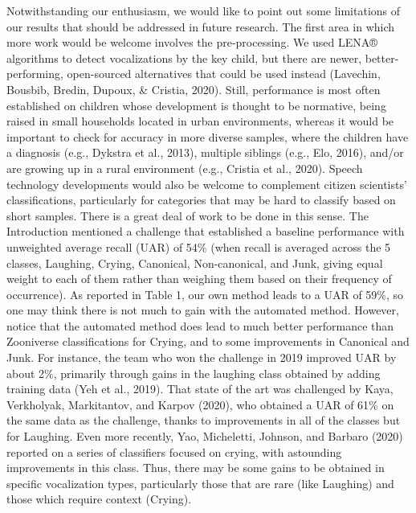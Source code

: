 \documentclass[
  english,
  ,man]{apa6}
\begin{document}
Notwithstanding our enthusiasm, we would like to point out some limitations of our results that should be addressed in future research. The first area in which more work would be welcome involves the pre-processing. We used LENA® algorithms to detect vocalizations by the key child, but there are newer, better-performing, open-sourced alternatives that could be used instead (Lavechin, Bousbib, Bredin, Dupoux, \& Cristia, 2020). Still, performance is most often established on children whose development is thought to be normative, being raised in small households located in urban environments, whereas it would be important to check for accuracy in more diverse samples, where the children have a diagnosis (e.g., Dykstra et al., 2013), multiple siblings (e.g., Elo, 2016), and/or are growing up in a rural environment (e.g., Cristia et al., 2020). Speech technology developments would also be welcome to complement citizen scientists' classifications, particularly for categories that may be hard to classify based on short samples. There is a great deal of work to be done in this sense. The Introduction mentioned a challenge that established a baseline performance with unweighted average recall (UAR) of 54\% (when recall is averaged across the 5 classes, Laughing, Crying, Canonical, Non-canonical, and Junk, giving equal weight to each of them rather than weighing them based on their frequency of occurrence). As reported in Table 1, our own method leads to a UAR of 59\%, so one may think there is not much to gain with the automated method. However, notice that the automated method does lead to much better performance than Zooniverse classifications for Crying, and to some improvements in Canonical and Junk. For instance, the team who won the challenge in 2019 improved UAR by about 2\%, primarily through gains in the laughing class obtained by adding training data (Yeh et al., 2019). That state of the art was challenged by Kaya, Verkholyak, Markitantov, and Karpov (2020), who obtained a UAR of 61\% on the same data as the challenge, thanks to improvements in all of the classes but for Laughing. Even more recently, Yao, Micheletti, Johnson, and Barbaro (2020) reported on a series of classifiers focused on crying, with astounding improvements in this class. Thus, there may be some gains to be obtained in specific vocalization types, particularly those that are rare (like Laughing) and those which require context (Crying).
\end{document}
